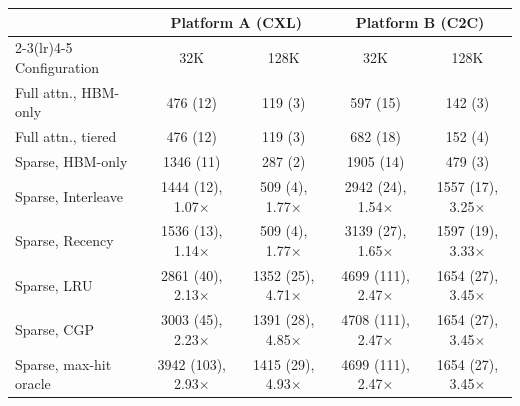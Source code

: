 \begin{tabular}{@{}lcccc@{}}
\toprule
 & \multicolumn{2}{c}{Platform A (CXL)} & \multicolumn{2}{c}{Platform B (C2C)} \\
\cmidrule(lr){2-3}\cmidrule(lr){4-5}
Configuration & 32K & 128K & 32K & 128K \\
\midrule
Full attn., HBM-only & 476 (12) & 119 (3) & 597 (15) & 142 (3) \\
Full attn., tiered & 476 (12) & 119 (3) & 682 (18) & 152 (4) \\
Sparse, HBM-only & 1346 (11) & 287 (2) & 1905 (14) & 479 (3) \\
\midrule
Sparse, Interleave & 1444 (12), 1.07$\times$ & 509 (4), 1.77$\times$ & 2942 (24), 1.54$\times$ & 1557 (17), 3.25$\times$ \\
Sparse, Recency & 1536 (13), 1.14$\times$ & 509 (4), 1.77$\times$ & 3139 (27), 1.65$\times$ & 1597 (19), 3.33$\times$ \\
Sparse, LRU & 2861 (40), 2.13$\times$ & 1352 (25), 4.71$\times$ & 4699 (111), 2.47$\times$ & 1654 (27), 3.45$\times$ \\
Sparse, CGP & 3003 (45), 2.23$\times$ & 1391 (28), 4.85$\times$ & 4708 (111), 2.47$\times$ & 1654 (27), 3.45$\times$ \\
Sparse, max-hit oracle & 3942 (103), 2.93$\times$ & 1415 (29), 4.93$\times$ & 4699 (111), 2.47$\times$ & 1654 (27), 3.45$\times$ \\
\bottomrule
\end{tabular}
